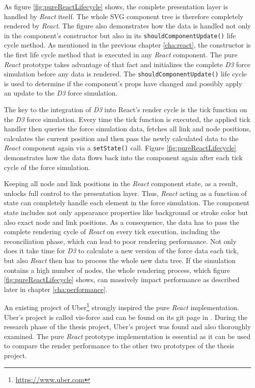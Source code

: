As figure \ref{fig:pureReactLifecycle} shows, the complete presentation layer is handled by \emph{React} itself. The whole SVG component tree is therefore completely rendered by \emph{React}. The figure also demonstrates how the data is handled not only in the component's constructor but also in its \texttt{shouldComponentUpdate()} life cycle method. As mentioned in the previous chapter \ref{cha:react}, the constructor is the first life cycle method that is executed in any \emph{React} component. The pure \emph{React} prototype takes advantage of that fact and initializes the complete \emph{D3} force simulation before any data is rendered. The \texttt{shouldComponentUpdate()} life cycle is used to determine if the component's props have changed and possibly apply an update to the \emph{D3} force simulation.

The key to the integration of \emph{D3} into React's render cycle is the tick function on the \emph{D3} force simulation. Every time the tick function is executed, the applied tick handler then queries the force simulation data, fetches all link and node positions, calculates the current position and then pass the newly calculated data to the \emph{React} component again via a \texttt{setState()} call. Figure \ref{fig:pureReactLifecycle} demonstrates how the data flows back into the component again after each tick cycle of the force simulation.

Keeping all node and link positions in the \emph{React} component state, as a result, unlocks full control to the presentation layer. Thus, \emph{React} acting as a function of state can completely handle each element in the force simulation. The component state includes not only appearance properties like background or stroke color but also exact node and link positions. As a consequence, the data has to pass the complete rendering cycle of \emph{React} on every tick execution, including the reconciliation phase, which can lead to poor rendering performance. Not only does it take time for \emph{D3} to calculate a new version of the force data each tick, but also \emph{React} then has to process the whole new data tree. If the simulation contains a high number of nodes, the whole rendering process, which figure \ref{fig:pureReactLifecycle} shows, can massively impact performance as described later in chapter \ref{cha:performance}.

An existing project of Uber\footnote{\url{https://www.uber.com}} strongly inspired the pure \emph{React} implementation. Uber's project is called vis-force and can be found on its git page in \cite{UberVisForce}. During the research phase of the thesis project, Uber's project was found and also thoroughly examined. The pure \emph{React} prototype implementation is essential as it can be used to compare the render performance to the other two prototypes of the thesis project.


